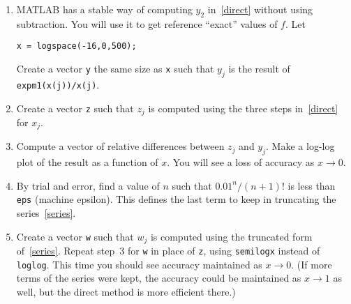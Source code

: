 \documentclass[11pt]{article}
\begin{document}
\begin{enumerate}
\item MATLAB has a stable way of computing $y_2$ in~\eqref{direct} without using subtraction. You will use it to get reference ``exact'' values of $f$. Let
\begin{verbatim}
x = logspace(-16,0,500);
\end{verbatim}
  Create a vector \texttt{y} the same size as \texttt{x} such that $y_j$ is the result of \texttt{expm1(x(j))/x(j)}.

\item Create a vector \texttt{z} such that $z_j$ is computed using the three steps in~\eqref{direct} for $x_j$.

\item Compute a vector of relative differences between $z_j$ and $y_j$. Make a log-log plot of the result as a function of $x$. You will see a loss of accuracy as $x\to 0$. 

\item By trial and error, find a value of $n$ such that $0.01^n/(n+1)!$ is less than \texttt{eps} (machine epsilon). This defines the last term to keep in truncating the series~\eqref{series}.

\item Create a vector \texttt{w} such that $w_j$ is computed using the truncated form of~\eqref{series}. Repeat step~3 for \texttt{w} in place of \texttt{z}, using \texttt{semilogx} instead of \texttt{loglog}. This time you should see accuracy maintained as $x\to 0$. (If more terms of the series were kept, the accuracy could be maintained as $x\to 1$ as well, but the direct method is more efficient there.)

\end{enumerate}
\end{document}
